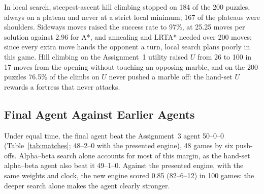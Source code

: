 \documentclass[conference,a4paper]{IEEEtran}
\begin{document}
In local search, steepest-ascent hill climbing stopped on 184 of the 200 puzzles, always on a plateau and never at a strict local minimum; 167 of the plateaus were shoulders. Sideways moves raised the success rate to 97\%, at 25.25 moves per solution against 2.96 for A*, and annealing and LRTA* needed over 200 moves; since every extra move hands the opponent a turn, local search plans poorly in this game. Hill climbing on the Assignment~1 utility raised $U$ from 26 to 100 in 17 moves from the opening without touching an opposing marble, and on the 200 puzzles 76.5\% of the climbs on $U$ never pushed a marble off: the hand-set $U$ rewards a fortress that never attacks.

\subsection{Final Agent Against Earlier Agents}
Under equal time, the final agent beat the Assignment~3 agent 50--0--0 (Table~\ref{tab:matches}; 48--2--0 with the presented engine), 48 games by six push-offs. Alpha--beta search alone accounts for most of this margin, as the hand-set alpha--beta agent also beat it 49--1--0. Against the presented engine, with the same weights and clock, the new engine scored 0.85 (82--6--12) in 100 games: the deeper search alone makes the agent clearly stronger.
\end{document}
